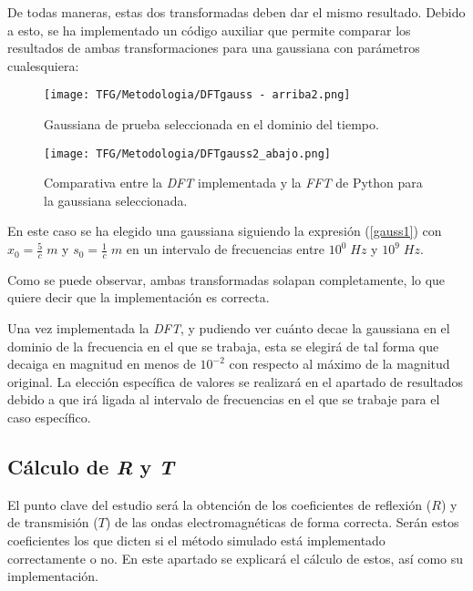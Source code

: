 \documentclass[11pt,a4paper,twoside,pdf]{article}
\numberwithin{equation}{section}
\begin{document}
De todas maneras, estas dos transformadas deben  dar el mismo resultado. Debido a esto, se ha implementado un código auxiliar que permite comparar los resultados de ambas transformaciones para una gaussiana con parámetros cualesquiera:
\begin{figure}[H]
\centering
\texttt{[image: TFG/Metodologia/DFTgauss - arriba2.png]}				
\caption{Gaussiana de prueba seleccionada en el dominio del tiempo.}
\end{figure}
\begin{figure}[H]
\centering
\texttt{[image: TFG/Metodologia/DFTgauss2\_abajo.png]}				
\caption{Comparativa entre la \textit{DFT} implementada y la \textit{FFT} de Python para la gaussiana seleccionada.}
\end{figure}
En este caso se ha elegido una gaussiana siguiendo la expresión (\ref{gauss1}) con $x_0=\frac{5}{c}\;m$ y $s_0=\frac{1}{c}\;m$ en un intervalo de frecuencias entre $10^0 \; Hz$ y $10^9\; Hz$.

Como se puede observar, ambas transformadas solapan completamente, lo que quiere decir que la implementación es correcta.

Una vez implementada la \textit{DFT}, y pudiendo ver cuánto decae la gaussiana en el dominio de la frecuencia en el que se trabaja, esta se elegirá de tal forma que decaiga en magnitud en menos de $10^{-2}$ con respecto al máximo de la magnitud original. La elección específica de valores se realizará en el apartado de resultados debido a que irá ligada al intervalo de frecuencias en el que se trabaje para el caso específico.

\subsection{Cálculo de \textit{R} y \textit{T}}
El punto clave del estudio será la obtención de los coeficientes de reflexión ($R$) y de transmisión ($T$) de las ondas electromagnéticas de forma correcta. Serán estos coeficientes los que dicten si el método simulado está implementado correctamente o no. En este apartado se explicará el cálculo de estos, así como su implementación.
\end{document}
